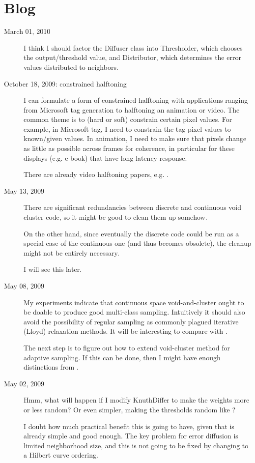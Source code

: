 \section{Blog}

\begin{description}
\item[March 01, 2010]
{
I think I should factor the Diffuser class into Thresholder, which chooses the output/threshold value, and Distributor, which determines the error values distributed to neighbors.
}
\item[October 18, 2009: constrained halftoning]
{
I can formulate a form of constrained halftoning with applications ranging from Microsoft tag generation to halftoning an animation or video. The common theme is to (hard or soft) constrain certain pixel values. For example, in Microsoft tag, I need to constrain the tag pixel values to known/given values. In animation, I need to make sure that pixels change as little as possible across frames for coherence, in particular for these displays (e.g. e-book) that have long latency response.

There are already video halftoning papers, e.g. \cite{Sun:2006:VH}.
}
\item[May 13, 2009]
{
There are significant redundancies between discrete and continuous void cluster code, so it might be good to clean them up somehow.

On the other hand, since eventually the discrete code could be run as a special case of the continuous one (and thus becomes obsolete), the cleanup might not be entirely necessary.

I will see this later.
}
\item[May 08, 2009]
{
My experiments indicate that continuous space void-and-cluster ought to be doable to produce good multi-class sampling.
Intuitively it should also avoid the possibility of regular sampling as commonly plagued iterative (Lloyd) relaxation methods.
It will be interesting to compare with \cite{Balzerand:2009:CCPD}.

The next step is to figure out how to extend void-cluster method for adaptive sampling. If this can be done, then I might have enough distinctions from \cite{Wang:1999:CBN}.
}
\item[May 02, 2009]
{
Hmm, what will happen if I modify KnuthDiffer to make the weights more or less random?
Or even simpler, making the thresholds random like \cite{Zhou:2003:IMT}?

I doubt how much practical benefit this is going to have, given that \cite{Zhou:2003:IMT} is already simple and good enough.
The key problem for error diffusion is limited neighborhood size, and this is not going to be fixed by changing to a Hilbert curve ordering.

}
\end{description}
